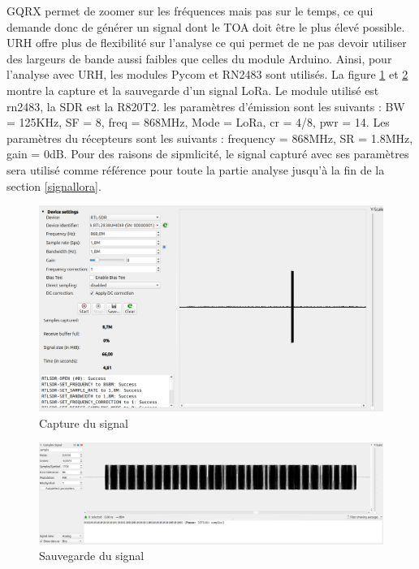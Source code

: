 GQRX permet de zoomer sur les fréquences mais pas sur le temps, ce qui demande donc de générer un signal dont le TOA doit être le plus élevé possible. URH offre plus de flexibilité sur l'analyse ce qui permet de ne pas devoir utiliser des largeurs de bande aussi faibles que celles du module Arduino. Ainsi, pour l'analyse avec URH, les modules Pycom et RN2483 sont utilisés. La figure \ref{term303} et \ref{term304} montre la capture et la sauvegarde d'un signal LoRa. Le module utilisé est rn2483, la SDR est la R820T2. les paramètres d'émission sont les suivants : BW = 125KHz, SF = 8, freq = 868MHz, Mode = LoRa, cr = 4/8, pwr = 14. Les paramètres du récepteurs sont les suivants : frequency = 868MHz, SR = 1.8MHz, gain = 0dB. Pour des raisons de sipmlicité, le signal capturé avec ses paramètres sera utilisé comme référence pour toute la partie analyse jusqu'à la fin de la section \ref{signallora}.

\newpage

\begin{figure}[h]
\centering

\includegraphics[scale=0.17]{images/urh2n.png}
\caption{Capture du signal}
\label{term303}
\end{figure}

\begin{figure}[h]
\centering

\includegraphics[scale=0.11]{images/urh3n.png}
\caption{Sauvegarde du signal}
\label{term304}
\end{figure}

